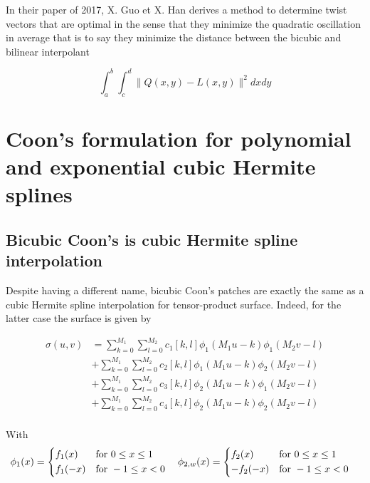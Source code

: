 \documentclass[a4paper, 11pt]{article}
\begin{document}
In their paper of 2017, X. Guo et X. Han derives a method to determine twist vectors that are optimal in the sense that 
they minimize the quadratic oscillation in average that is to say they minimize the distance between the bicubic and 
bilinear interpolant

\begin{equation}
  \int_a^b \int_c^d \|Q(x,y) - L(x,y)\|^2 dxdy
\end{equation}

\section{Coon's formulation for polynomial and exponential cubic Hermite splines}

\subsection{Bicubic Coon's is cubic Hermite spline interpolation}

Despite having a different name, bicubic Coon's patches are exactly the same as a cubic Hermite spline interpolation for 
tensor-product surface.  Indeed, for the latter case the surface is given by

\begin{align*}
  \sigma(u,v) &= \sum_{k=0}^{M_1} \sum_{l=0}^{M_2} c_1[k,l] \phi_{1}(M_1u-k)\phi_{1}(M_2v-l) \\
  &+ \sum_{k=0}^{M_1} \sum_{l=0}^{M_2} c_2[k,l] \phi_{1}(M_1u-k)\phi_{2}(M_2v-l) \\
  &+ \sum_{k=0}^{M_1} \sum_{l=0}^{M_2} c_3[k,l] \phi_{2}(M_1u-k)\phi_{1}(M_2v-l) \\
  &+ \sum_{k=0}^{M_1} \sum_{l=0}^{M_2} c_4[k,l] \phi_{2}(M_1u-k)\phi_{2}(M_2v-l) \\
\end{align*}

With 
\begin{align*}
  \phi_{1}(x) =
  \begin{dcases}
    f_{1}(x) &\text{for }  0 \leq x \leq 1 \\
    f_{1}(-x) &\text{for } -1 \leq x < 0\\
  \end{dcases} \quad
  \hfill
  \phi_{2, w}(x) =
  \begin{dcases}
    f_{2}(x) &\text{for }  0 \leq x \leq 1 \\
    -f_{2}(-x) &\text{for } -1 \leq x < 0\\
  \end{dcases} \quad
\end{align*}
\end{document}
